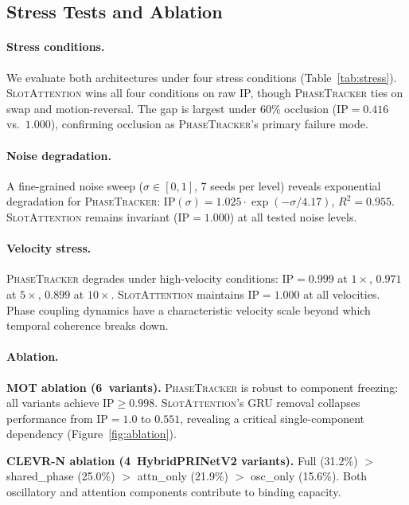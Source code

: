 \documentclass[11pt]{article}
\providecommand{\pt}{\textnormal{\textsc{PhaseTracker}}\xspace}
\providecommand{\sa}{\textnormal{\textsc{SlotAttention}}\xspace}
\providecommand{\ip}{\text{IP}}
\begin{document}
\subsection{Stress Tests and Ablation}
\label{sec:ablation}

\paragraph{Stress conditions.}
We evaluate both architectures under four stress conditions
(Table~\ref{tab:stress}).  \sa wins all four conditions on raw IP,
though \pt ties on swap and motion-reversal.  The gap is largest
under 60\% occlusion ($\ip = 0.416$ vs.\ $1.000$), confirming
occlusion as \pt's primary failure mode.



\paragraph{Noise degradation.}
A fine-grained noise sweep ($\sigma \in [0, 1]$, 7 seeds per level)
reveals exponential degradation for \pt:
$\ip(\sigma) = 1.025 \cdot \exp(-\sigma / 4.17)$, $R^2 = 0.955$.
\sa remains invariant ($\ip = 1.000$) at all tested noise levels.

\paragraph{Velocity stress.}
\pt degrades under high-velocity conditions: $\ip = 0.999$ at
$1\times$, $0.971$ at $5\times$, $0.899$ at $10\times$.  \sa
maintains $\ip = 1.000$ at all velocities.  Phase coupling dynamics
have a characteristic velocity scale beyond which temporal coherence
breaks down.

\paragraph{Ablation.}
\textbf{MOT ablation (6~variants).}  \pt is robust to component
freezing: all variants achieve $\ip \geq 0.998$.  \sa's GRU
removal collapses performance from $\ip = 1.0$ to $0.551$, revealing
a critical single-component dependency
(Figure~\ref{fig:ablation}).

\textbf{CLEVR-N ablation (4~HybridPRINetV2 variants).}
Full (31.2\%) $>$ shared\_phase (25.0\%) $>$ attn\_only (21.9\%)
$>$ osc\_only (15.6\%).  Both oscillatory and attention components
contribute to binding capacity.
\end{document}
